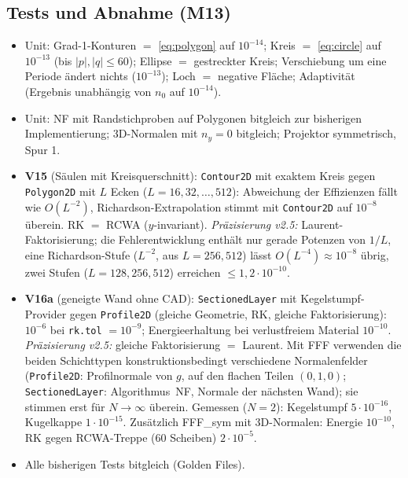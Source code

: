 \subsection{Tests und Abnahme (M13)}
\begin{itemize}[nosep]
  \item Unit: Grad-1-Konturen $=$ \eqref{eq:polygon} auf $10^{-14}$; Kreis $=$ \eqref{eq:circle} auf $10^{-13}$ (bis
        $|p|,|q|\le60$); Ellipse $=$ gestreckter Kreis; Verschiebung um eine Periode ändert nichts ($10^{-13}$);
        Loch $=$ negative Fläche; Adaptivität (Ergebnis unabhängig von $n_0$ auf $10^{-14}$).
  \item Unit: NF mit Randstichproben auf Polygonen bitgleich zur bisherigen Implementierung; 3D-Normalen mit $n_y=0$
        bitgleich; Projektor symmetrisch, Spur 1.
  \item \textbf{V15} (Säulen mit Kreisquerschnitt): \verb|Contour2D| mit exaktem Kreis gegen \verb|Polygon2D| mit $L$ Ecken
        ($L=16,32,\dots,512$): Abweichung der Effizienzen fällt wie $O(L^{-2})$, Richardson-Extrapolation stimmt mit
        \verb|Contour2D| auf $10^{-8}$ überein. RK $=$ RCWA ($y$-invariant).
        \emph{Präzisierung v2.5:} Laurent-Faktorisierung; die Fehlerentwicklung enthält nur gerade Potenzen von $1/L$,
        eine Richardson-Stufe ($L^{-2}$, aus $L=256,512$) lässt $O(L^{-4})\approx10^{-8}$ übrig, zwei Stufen
        ($L=128,256,512$) erreichen $\le1{,}2\cdot10^{-10}$.
  \item \textbf{V16a} (geneigte Wand ohne CAD): \verb|SectionedLayer| mit Kegelstumpf-Provider gegen \verb|Profile2D|
        (gleiche Geometrie, RK, gleiche Faktorisierung): $10^{-6}$ bei \verb|rk.tol| $=10^{-9}$; Energieerhaltung bei
        verlustfreiem Material $10^{-10}$.
        \emph{Präzisierung v2.5:} gleiche Faktorisierung $=$ Laurent. Mit FFF verwenden die beiden Schichttypen
        konstruktionsbedingt verschiedene Normalenfelder (\verb|Profile2D|: Profilnormale von $g$, auf den flachen
        Teilen $(0,1,0)$; \verb|SectionedLayer|: Algorithmus~NF, Normale der nächsten Wand); sie stimmen erst für
        $N\to\infty$ überein. Gemessen ($N=2$): Kegelstumpf $5\cdot10^{-16}$, Kugelkappe $1\cdot10^{-15}$. Zusätzlich
        FFF\_sym mit 3D-Normalen: Energie $10^{-10}$, RK gegen RCWA-Treppe (60 Scheiben) $2\cdot10^{-5}$.
  \item Alle bisherigen Tests bitgleich (Golden Files).
\end{itemize}

